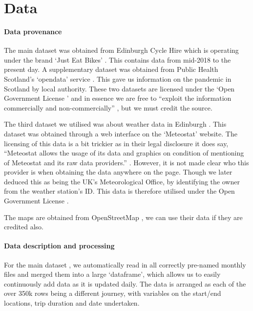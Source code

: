 \documentclass[11pt,a4paper]{article}
\begin{document}
\section{Data}

\paragraph{Data provenance} 
The main dataset was obtained from Edinburgh Cycle Hire which is operating under the brand ‘Just Eat Bikes’ \cite{JustEat}. This contains data from mid-2018 to the present day. A supplementary dataset was obtained from Public Health Scotland’s ‘opendata’ service \cite{PHS}. This gave us information on the pandemic in Scotland by local authority. These two datasets are licensed under the ‘Open Government License ’\cite{Open-Government-Licence} and in essence we are free to “exploit the information commercially and non-commercially” \cite{Open-Government-Licence}, but we must credit the source.

The third dataset we utilised was about weather data in Edinburgh \cite{Meteostat}. This dataset was obtained through a web interface on the ‘Meteostat’ website. The licensing of this data is a bit trickier as in their legal disclosure it does say, “Meteostat allows the usage of its data and graphics on condition of mentioning of Meteostat and its raw data providers.” \cite{Meteostatlegal}. However, it is not made clear who this provider is when obtaining the data anywhere on the page. Though we later deduced this as being the UK’s Meteorological Office, by identifying the owner from the weather station’s ID. This data is therefore utilised under the Open Government License \cite{Open-Government-Licence}.

The maps are obtained from OpenStreetMap \cite{openstreetmap}, we can use their data if they are credited also. 

\paragraph{Data description and processing} 

For the main dataset \cite{JustEat}, we automatically read in all correctly pre-named monthly files and merged them into a large ‘dataframe’, which allows us to easily continuously add data as it is updated daily. The data is arranged as each of the over 350k rows being a different journey, with variables on the start/end locations, trip duration and date undertaken. 
\end{document}
